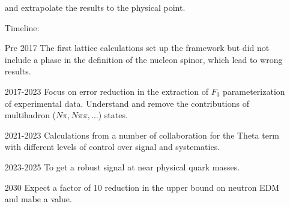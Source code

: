 \documentclass[prd,showpacs,showkeys,preprintnumbers,floatfix,
nofootinbib%
]{revtex4-2}
\begin{document}
\begin{itemize}
      and extrapolate the results to the physical point.
\item[Timeline:]
    \item[Pre 2017] The first lattice calculations set up the
      framework but did not include a phase in the definition of the
      nucleon spinor, which lead to wrong results.  
    \item[2017-2023] Focus on error reduction in the extraction of
      $F_3$ parameterization of experimental data. Understand and remove 
      the contributions of multihadron ($N\pi,
      N\pi\pi, \ldots$) states. 
    \item[2021-2023] Calculations from a number of collaboration for
      the Theta term with different levels of control over signal and
      systematics.  
    \item[2023-2025] To get a robust signal at near physical quark masses. 
    \item[2030] Expect a factor of 10 reduction in the upper bound on
      neutron EDM and mabe a value.  
\end{itemize}

\end{document}
